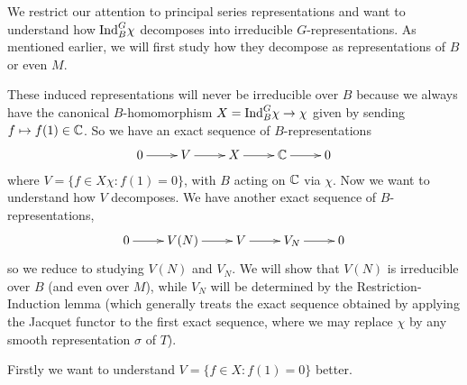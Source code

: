 We restrict our attention to principal series representations and want to understand how $\mathrm{Ind}_B^G \chi$ decomposes into irreducible $G$-representations. As mentioned earlier, we will first study how they decompose as representations of $B$ or even $M$. 

These induced representations will never be irreducible over $B$ because we always have the canonical $B$-homomorphism $X=\mathrm{Ind}_B^G \chi \to \chi$ given by sending $f \mapsto f(1) \in \mathbb{C}$. So we have an exact sequence of $B$-representations
$$\xymatrix{0 \ar[r] & V \ar[r] & X \ar[r] & \CC \ar[r] & 0}$$
where $V=\{f \in X \chi : f(1)=0\}$, with $B$ acting on $\mathbb{C}$ via $\chi$. Now we want to understand how $V$ decomposes. We have another exact sequence of $B$-representations,
$$\xymatrix{0 \ar[r] & V(N) \ar[r] & V \ar[r] & V_N \ar[r] & 0}$$
so we reduce to studying $V(N)$ and $V_N$. We will show that $V(N)$ is irreducible over $B$ (and even over $M$), while $V_N$ will be determined by the Restriction-Induction lemma (which generally treats the exact sequence obtained by applying the Jacquet functor to the first exact sequence, where we may replace $\chi$ by any smooth representation $\sigma$ of $T$).

Firstly we want to understand $V=\{f \in X:f(1)=0\}$ better.

